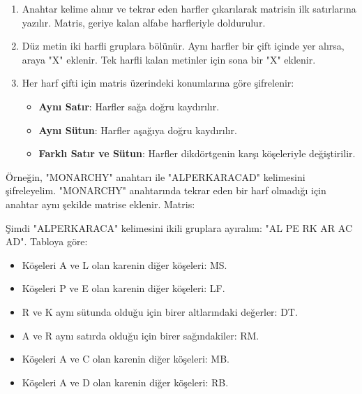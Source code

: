 \begin{enumerate}
    \item Anahtar kelime alınır ve tekrar eden harfler çıkarılarak matrisin ilk satırlarına yazılır. Matris, geriye kalan alfabe harfleriyle doldurulur.
    \item Düz metin iki harfli gruplara bölünür. Aynı harfler bir çift içinde yer alırsa, araya "X" eklenir. Tek harfli kalan metinler için sona bir "X" eklenir.
    \item Her harf çifti için matris üzerindeki konumlarına göre şifrelenir:
    \begin{itemize}
        \item \textbf{Aynı Satır}: Harfler sağa doğru kaydırılır.
        \item \textbf{Aynı Sütun}: Harfler aşağıya doğru kaydırılır.
        \item \textbf{Farklı Satır ve Sütun}: Harfler dikdörtgenin karşı köşeleriyle değiştirilir.
    \end{itemize}
\end{enumerate}

Örneğin, "MONARCHY" anahtarı ile "ALPERKARACAD" kelimesini şifreleyelim. "MONARCHY" anahtarında tekrar eden bir harf olmadığı için anahtar aynı şekilde matrise eklenir. Matris:

\begin{table}[ht]
\centering
{}
\end{table}

Şimdi "ALPERKARACA" kelimesini ikili gruplara ayıralım: "AL PE RK AR AC AD". Tabloya göre:

\begin{itemize}
    \item Köşeleri A ve L olan karenin diğer köşeleri: MS.
    \item Köşeleri P ve E olan karenin diğer köşeleri: LF.
    \item R ve K aynı sütunda olduğu için birer altlarındaki değerler: DT.
    \item A ve R aynı satırda olduğu için birer sağındakiler: RM.
    \item Köşeleri A ve C olan karenin diğer köşeleri: MB.
    \item Köşeleri A ve D olan karenin diğer köşeleri: RB.
\end{itemize}

